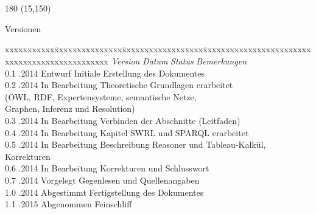 
\chapter*{}
\label{chap:versionen}

\begin{textblock}{180} (15,150)
\color{black}
\begin{huge}
Versionen
\end{huge}
\vspace{10mm}

\fontsize{10pt}{18pt}\selectfont
\begin{tabbing}
xxxxxxxxxxx\=xxxxxxxxxxxxxxx\=xxxxxxxxxxxxxxxxxx\=xxxxxxxxxxxxxxxxxxxxxxxxxxxxxxxxxxxxxxxxxxxxxxx \kill
\textit{Version}    \> \textit{Datum}   \> \textit{Status}      \> \textit{Bemerkungen}\\
0.1                 .2014       \> Entwurf              \> Initiale Erstellung des Dokumentes\\
0.2                 .2014       \> In Bearbeitung       \> Theoretische Grundlagen erarbeitet \\
                    \>                  \>                      \> (OWL, RDF, Expertensysteme, semantische Netze, \\
                    \>                  \>                      \> Graphen, Inferenz und Resolution)\\
0.3                 .2014       \> In Bearbeitung       \> Verbinden der Abschnitte (Leitfaden)\\
0.4                 .2014       \> In Bearbeitung       \> Kapitel SWRL und SPARQL erarbeitet\\
0.5                 .2014       \> In Bearbeitung       \> Beschreibung Reasoner und Tableau-Kalkül, Korrekturen\\
0.6                 .2014       \> In Bearbeitung       \> Korrekturen und Schlusswort\\
0.7                 .2014       \> Vorgelegt            \> Gegenlesen und Quellenangaben\\
1.0                 .2014       \> Abgestimmt           \> Fertigstellung des Dokumentes\\
1.1                 .2015       \> Abgenommen           \> Feinschliff\\
\end{tabbing}

\end{textblock}
